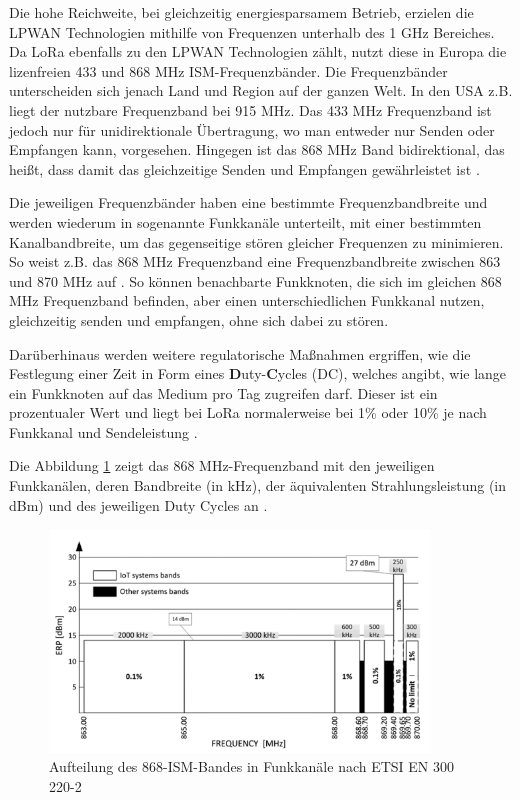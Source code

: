 Die hohe Reichweite, bei gleichzeitig energiesparsamem Betrieb, erzielen die LPWAN Technologien mithilfe von Frequenzen unterhalb des 1 GHz Bereiches. Da LoRa ebenfalls zu den LPWAN Technologien zählt, nutzt diese in Europa die lizenfreien 433 und 868 MHz ISM-Frequenzbänder. Die Frequenzbänder unterscheiden sich jenach Land und Region auf der ganzen Welt. In den USA z.B. liegt der nutzbare Frequenzband bei 915 MHz. Das 433 MHz Frequenzband ist jedoch nur für unidirektionale Übertragung, wo man entweder nur Senden oder Empfangen kann, vorgesehen. Hingegen ist das 868 MHz Band bidirektional, das heißt, dass damit das gleichzeitige Senden und Empfangen gewährleistet ist \cite{lpwan2022}. 

Die jeweiligen Frequenzbänder haben eine bestimmte Frequenzbandbreite und werden wiederum in sogenannte Funkkanäle unterteilt, mit einer bestimmten Kanalbandbreite, um das gegenseitige stören gleicher Frequenzen zu minimieren. So weist z.B. das 868 MHz Frequenzband eine Frequenzbandbreite zwischen 863 und 870 MHz auf \cite{Staniec2020}. So können benachbarte Funkknoten, die sich im gleichen 868 MHz Frequenzband befinden, aber einen unterschiedlichen Funkkanal nutzen, gleichzeitig senden und empfangen, ohne sich dabei zu stören. 

Darüberhinaus werden weitere regulatorische Maßnahmen ergriffen, wie die Festlegung einer Zeit in Form eines \textbf{D}uty-\textbf{C}ycles (DC), welches angibt, wie lange ein Funkknoten auf das Medium pro Tag zugreifen darf. Dieser ist ein prozentualer Wert und liegt bei LoRa normalerweise bei 1\% oder 10\% je nach Funkkanal und Sendeleistung \cite{Staniec2020}. 

Die Abbildung \ref{fig:868-band} zeigt das 868 MHz-Frequenzband mit den jeweiligen Funkkanälen, deren Bandbreite (in kHz), der äquivalenten Strahlungsleistung (in dBm) und des jeweiligen Duty Cycles an . 

\begin{figure}[h]
 \centering
 \includegraphics[width=0.9\textwidth]{pictures/868-band}
 \caption[Aufteilung des 868-ISM-Bandes in Funkkanäle nach ETSI EN 300 220-2]{Aufteilung des 868-ISM-Bandes in Funkkanäle nach ETSI EN 300 220-2 \cite{Staniec2020}}
 \label{fig:868-band}
\end{figure}


